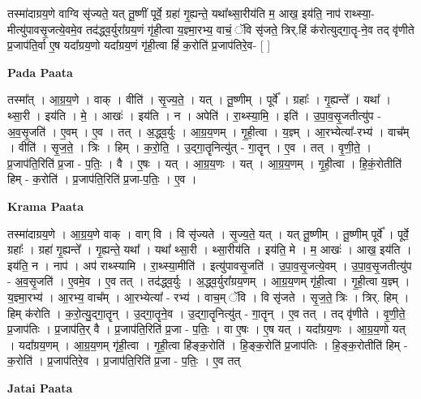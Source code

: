\documentclass[17pt]{extarticle}
\begin{document}
तस्मा॑दाग्रय॒णे वाग्वि सृ॑ज्यते॒ यत् तू॒ष्णीं पूर्वे॒ ग्रहा॑ गृ॒ह्यन्ते॒ यथा᳚थ्सा॒रीय॑ति म॒ आख॒ इय॑ति॒ नाप॑ राथ्स्या॒-मीत्यु॑पावसृ॒जत्ये॒वमे॒व तद॑द्ध्व॒र्युरा᳚ग्रय॒णं गृ॑ही॒त्वा य॒ज्ञ्मा॒रभ्य॒ वाचं॒ ॅवि सृ॑जते॒ त्रिर्.हिं क॑रोत्युद्गा॒तॄ-ने॒व तद् वृ॑णीते प्र॒जाप॑ति॒र्वा ए॒ष यदा᳚ग्रय॒णो यदा᳚ग्रय॒णं गृ॑ही॒त्वा हिं॑ क॒रोति॑ प्र॒जाप॑तिरे॒व- [  ] \newline

\textbf{Pada Paata} \newline

तस्मा᳚त् । आ॒ग्र॒य॒णे । वाक् । वीति॑ । सृ॒ज्य॒ते॒ । यत् । तू॒ष्णीम् । पूर्वे᳚ । ग्रहाः᳚ । गृ॒ह्यन्ते᳚ । यथा᳚ । थ्सा॒री । इय॑ति । मे॒ । आखः॑ । इय॑ति । न । अपेति॑ । रा॒थ्स्या॒मि॒ । इति॑ । उ॒पा॒व॒सृ॒जतीत्यु॑प - अ॒व॒सृ॒जति॑ । ए॒वम् । ए॒व । तत् । अ॒द्ध्व॒र्युः । आ॒ग्र॒य॒णम् । गृ॒ही॒त्वा । य॒ज्ञ्म् । आ॒रभ्येत्या᳚-रभ्य॑ । वाच᳚म् । वीति॑ । सृ॒ज॒ते॒ । त्रिः । हिम् । क॒रो॒ति॒ । उ॒द्गा॒तॄनित्यु॑त् - गा॒तॄन् । ए॒व । तत् । वृ॒णी॒ते॒ । प्र॒जाप॑ति॒रिति॑ प्र॒जा - प॒तिः॒ । वै । ए॒षः । यत् । आ॒ग्र॒य॒णः । यत् । आ॒ग्र॒य॒णम् । गृ॒ही॒त्वा । हि॒कं॒रोतीति॑ हिम् - क॒रोति॑ । प्र॒जाप॑ति॒रिति॑ प्र॒जा-प॒तिः॒ । ए॒व ।  \newline


\textbf{Krama Paata} \newline

तस्मा॑दाग्रय॒णे । आ॒ग्र॒य॒णे वाक् । वाग् वि । वि सृ॑ज्यते । सृ॒ज्य॒ते॒ यत् । यत् तू॒ष्णीम् । तू॒ष्णीम् पूर्वे᳚ । पूर्वे॒ ग्रहाः᳚ । ग्रहा॑ गृ॒ह्यन्ते᳚ । गृ॒ह्यन्ते॒ यथा᳚ । यथा᳚ थ्सा॒री । थ्सा॒रीय॑ति । इय॑ति॒ मे । म॒ आखः॑ । आख॒ इय॑ति । इय॑ति॒ न । नाप॑ । अप॑ राथ्स्यामि । रा॒थ्स्या॒मीति॑ । इत्यु॑पावसृ॒जति॑ । उ॒पा॒व॒सृ॒जत्ये॒वम् । उ॒पा॒व॒सृ॒जतीत्यु॑प - अ॒व॒सृ॒जति॑ । ए॒वमे॒व । ए॒व तत् । तद॑द्ध्व॒र्युः । अ॒द्ध्व॒र्युरा᳚ग्रय॒णम् । आ॒ग्र॒य॒णम् गृ॑ही॒त्वा । गृ॒ही॒त्वा य॒ज्ञ्म् । य॒ज्ञ्मा॒रभ्य॑ । आ॒रभ्य॒ वाच᳚म् । आ॒रभ्येत्या᳚ - रभ्य॑ । वाच॒म् ॅवि । वि सृ॑जते । सृ॒ज॒ते॒ त्रिः । त्रिर्. हिम् । हिम् क॑रोति । क॒रो॒त्यु॒द्‌गा॒तॄन् । उ॒द्‌गा॒तॄने॒व । उ॒द्‌गा॒तॄनित्यु॑त् - गा॒तॄन् । ए॒व तत् । तद् वृ॑णीते । वृ॒णी॒ते॒ प्र॒जाप॑तिः । प्र॒जाप॑ति॒र् वै । प्र॒जाप॑ति॒रिति॑ प्र॒जा - प॒तिः॒ । वा ए॒षः । ए॒ष यत् । यदा᳚ग्रय॒णः । आ॒ग्र॒य॒णो यत् । यदा᳚ग्रय॒णम् । आ॒ग्र॒य॒णम् गृ॑ही॒त्वा । गृ॒ही॒त्वा हि॑ङ्‍क॒रोति॑ । हि॒ङ्‍क॒रोति॑ प्र॒जाप॑तिः । हि॒ङ्‍क॒रोतीति॑ हिम् - क॒रोति॑ । प्र॒जाप॑तिरे॒व । प्र॒जाप॑ति॒रिति॑ प्र॒जा - प॒तिः॒ । ए॒व तत् \newline

\textbf{Jatai Paata} \newline
\end{document}
